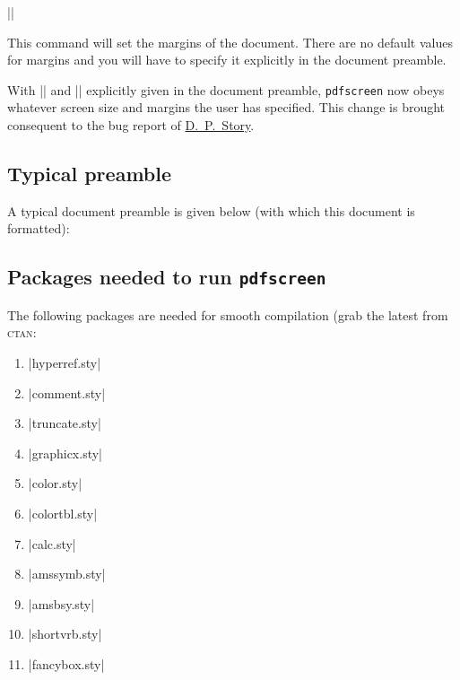 \documentclass[a4paper]{article}
\def\pdfscreen{\texttt{\small\color{section1}pdfscreen}\xspace}
\begin{document}
\begin{decl}
 |\margins|
\end{decl}
This command will set the margins of the document.
There are no default values for margins and you will have to specify it
explicitly in the document preamble.

With |\margins| and |\screensize| explicitly given in the document
preamble, \pdfscreen now obeys whatever screen size and
margins the user has specified. This change is brought consequent to
the bug report of \href{dpstory@uakron.edu}{D.~P.~Story}.

\subsection{Typical preamble}
A typical document preamble is given below (with which this document is
formatted):


\subsection{Packages needed to run \pdfscreen}
The following packages are needed for smooth compilation (grab the
latest from \textsc{ctan}:

\begin{enumerate}
\item |hyperref.sty|
\item |comment.sty|
\item |truncate.sty|
\item |graphicx.sty|
\item |color.sty|
\item |colortbl.sty|
\item |calc.sty|
\item |amssymb.sty|
\item |amsbsy.sty|
\item |shortvrb.sty|
\item |fancybox.sty|

\end{enumerate}
\end{document}
